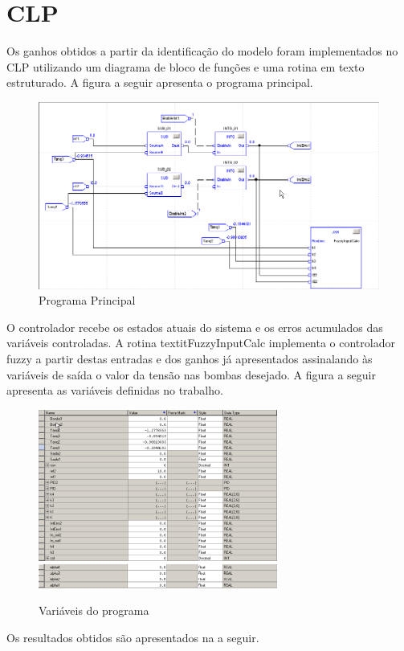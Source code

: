 \section{CLP}
Os ganhos obtidos a partir da identificação do modelo foram implementados no CLP utilizando um diagrama de bloco de funções e uma rotina em texto estruturado. A figura a seguir apresenta o programa principal. 

\begin{figure}[H]
	\centering
	\includegraphics[width=\textwidth]{img/clp_bf2.png}
	\caption{Programa Principal}
	\label{figCLPCLPbf}
\end{figure}

O controlador recebe os estados atuais do sistema e os erros acumulados das variáveis controladas. A rotina textit{FuzzyInputCalc} implementa o controlador fuzzy a partir destas entradas e dos ganhos já apresentados assinalando às variáveis de saída o valor da tensão nas bombas desejado. A figura a seguir apresenta as variáveis definidas no trabalho.

\begin{figure}[H]
	\centering
	\includegraphics[width=0.7\textwidth]{img/tags1.png}\\
	\includegraphics[width=0.7\textwidth]{img/tags2.png}
	\caption{Variáveis do programa}
	\label{figCLPTags1}
\end{figure}

Os resultados obtidos são apresentados na  a seguir.

%

